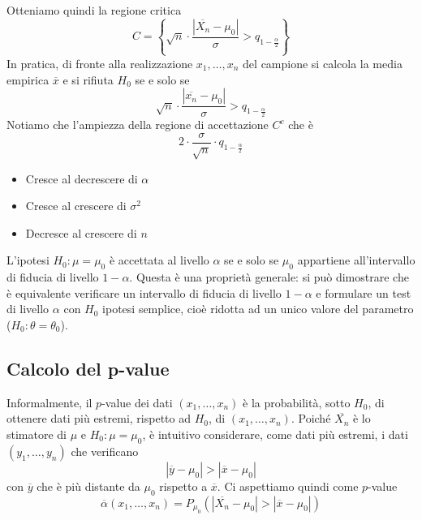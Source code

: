 Otteniamo quindi la regione critica
\[
	C = \left\{ \sqrt{n} \cdot \frac{|\overline{X_n} -
		\mu_0|}{\sigma} > q_{1 - \frac{\alpha}{2}} \right\}
\]
In pratica, di fronte alla realizzazione $x_1, \dots, x_n$ del campione si calcola la media
empirica $\overline{x}$ e si rifiuta $H_0$ se e solo se
\[ \sqrt{n} \cdot \frac{|\overline{x_n} - \mu_0|}{\sigma} > q_{1 - \frac{\alpha}{2}}  \]
Notiamo che l'ampiezza della regione di accettazione $C^c$ che è
\[ 2 \cdot \frac{\sigma}{\sqrt{n}} \cdot q_{1 - \frac{\alpha}{2}} \]
\begin{itemize}
	\item Cresce al decrescere di $\alpha$
	\item Cresce al crescere di $\sigma^2$
	\item Decresce al crescere di $n$
\end{itemize}

\begin{observation}
	L'ipotesi $H_0: \mu = \mu_0$ è accettata al livello $\alpha$ se e solo se $\mu_0$ appartiene
	all'intervallo di fiducia di livello $1-\alpha$. Questa è una proprietà generale: si può
	dimostrare che è equivalente verificare un intervallo di fiducia di livello $1-\alpha$ e
	formulare un test di livello $\alpha$ con $H_0$ ipotesi semplice, cioè ridotta ad un unico
	valore del parametro ($H_0 : \theta = \theta_0$).
\end{observation}

\subsection{Calcolo del p-value}
Informalmente, il $p$-value dei dati $(x_1, \dots, x_n)$ è la probabilità, sotto $H_0$, di
ottenere dati più estremi, rispetto ad $H_0$, di $(x_1, \dots, x_n)$. Poiché $\overline{X_n}$ è
lo stimatore di $\mu$ e $H_0: \mu = \mu_0$, è intuitivo considerare, come dati più estremi, i dati
$(y_1, \dots, y_n)$ che verificano
\[ |\overline{y} - \mu_0| > |\overline{x} - \mu_0| \]
con $\overline{y}$ che è più distante da $\mu_0$ rispetto a $\overline{x}$. Ci aspettiamo quindi
come $p$-value
\[
	\overline{\alpha} (x_1, \dots, x_n) =
	P_{\mu_0} (|\overline{X_n} - \mu_0| > |\overline{x} - \mu_0|)
\]